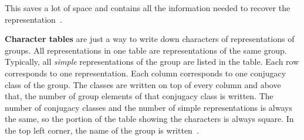 This saves a lot of space and contains all the information needed to recover the representation~\cite{fulton2013}.


\textbf{Character tables} are just a way to write down characters of representations of groups.
All representations in one table are representations of the same group.
Typically, all \textit{simple} representations of the group are listed in the table.
Each row corresponds to one representation.
Each column corresponds to one conjugacy class of the group.
The classes are written on top of every column and above that, the number of group elements of that conjugacy class is written.
The number of conjugacy classes and the number of simple representations is always the same, so the portion of the table showing the characters is always square.
In the top left corner, the name of the group is written~\cite{fulton2013}.
